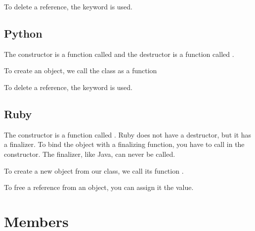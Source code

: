 \documentclass{KodeBook}
\begin{document}


To delete a reference, the keyword  is used.



\subsection{Python}

The constructor is a function called  and the destructor is a function called .



To create an object, we call the class as a function



To delete a reference, the keyword  is used.




\subsection{Ruby}

The constructor is a function called .
Ruby does not have a destructor, but it has a finalizer.
To bind the object with a finalizing function, you have to call  in the constructor.
The finalizer, like Java, can never be called.



To create a new object from our class, we call its function .



To free a reference from an object, you can assign it the  value.



\section{Members}
\end{document}
